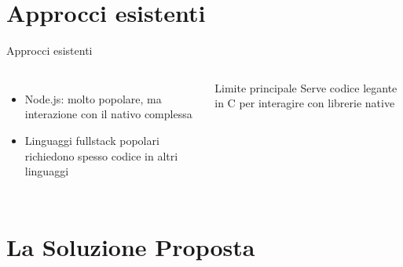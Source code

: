 \documentclass[aspectratio=169]{beamer}
\begin{document}
\section{Approcci esistenti}

\begin{frame}{Approcci esistenti}
  \begin{columns}
      \begin{itemize}
        \item Node.js: molto popolare, ma interazione con il nativo complessa
        \item Linguaggi fullstack popolari richiedono spesso codice in altri linguaggi
      \end{itemize}
      \begin{alertblock}{Limite principale}
        Serve codice legante in C per interagire con librerie native
      \end{alertblock}
  \end{columns}
\end{frame}

\section{La Soluzione Proposta}
\end{document}
